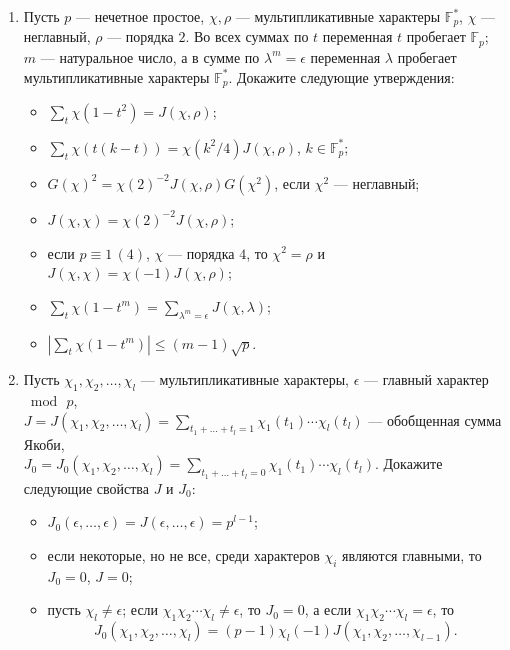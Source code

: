 \documentclass[a4paper, 11pt]{article}
\begin{document}
\begin{enumerate}[topsep=0pt]
    \item Пусть $p$ --- нечетное простое, $\chi, \rho$ --- мультипликативные характеры $\mathbb{F}_p^*$, $\chi$ --- неглавный, $\rho$ --- порядка $2$. Во всех суммах по $t$ переменная $t$ пробегает $\mathbb{F}_p$; $m$ --- натуральное число, а в сумме по $\lambda^m=\epsilon$ переменная $\lambda$ пробегает мультипликативные характеры $\mathbb{F}_p^*$. Докажите следующие утверждения:
    \begin{itemize}[topsep=0pt]
        \item $\sum_t \chi(1-t^2)=J(\chi,\rho)$; %
        \item $\sum_t \chi(t(k-t))=\chi(k^2/4)J(\chi,\rho)$, $k\in\mathbb{F}_p^*$; %
        \item $G(\chi)^2=\chi(2)^{-2}J(\chi,\rho) G(\chi^2)$, если $\chi^2$ --- неглавный; %
        \item $J(\chi,\chi)=\chi(2)^{-2}J(\chi,\rho)$; %
        \item если $p\equiv 1\, (4)$, $\chi$ --- порядка $4$, то $\chi^2=\rho$ и $J(\chi,\chi)=\chi(-1)J(\chi,\rho)$; %
        \item $\sum_t \chi(1-t^m) = \sum_{\lambda^m=\epsilon} J(\chi,\lambda)$; %
        \item $|\sum_t \chi(1-t^m)| \leqslant (m-1) \sqrt{p}$. %
    \end{itemize}

    \item Пусть $\chi_1, \chi_2, \dots, \chi_l$ --- мультипликативные характеры, $\epsilon$ --- главный характер $\bmod\, p$,\\ $J = J(\chi_1, \chi_2, \dots, \chi_l) = \sum\limits_{t_1+\dots+t_l=1} \chi_1(t_1) \cdots \chi_l(t_l)$ --- обобщенная сумма Якоби,\\ $J_0 = J_0(\chi_1, \chi_2, \dots, \chi_l) = \sum\limits_{t_1+\dots+t_l=0} \chi_1(t_1) \cdots \chi_l(t_l)$. Докажите следующие свойства $J$ и $J_0$:
    \begin{itemize}[noitemsep,topsep=0pt]
        \item $J_0(\epsilon, \dots, \epsilon) = J(\epsilon, \dots, \epsilon) = p^{l-1}$;
        \item если некоторые, но не все, среди характеров $\chi_i$ являются главными, то $J_0 = 0$, $J = 0$;
        \item пусть $\chi_l \neq \epsilon$; если $\chi_1 \chi_2 \cdots \chi_l \neq \epsilon$, то $J_0 = 0$, а если $\chi_1 \chi_2 \cdots \chi_l = \epsilon$, то
        \[
            J_0(\chi_1, \chi_2, \dots, \chi_l)=(p-1)\chi_l(-1)J(\chi_1, \chi_2, \dots, \chi_{l-1}).
        \]
    \end{itemize} %


\end{enumerate}
\end{document}
